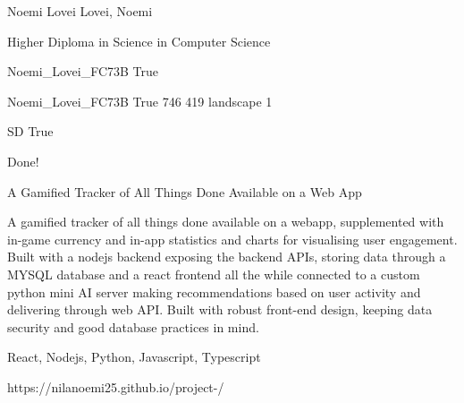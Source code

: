 \documentclass[twoside]{report}
\begin{document}
\begingroup{}\relax



\def\Key{Noemi_Lovei_FC73B}

{Noemi Lovei}
{Lovei, Noemi}

{Higher Diploma in Science in Computer Science}

{Noemi_Lovei_FC73B}
{True}

{Noemi_Lovei_FC73B}
{True}
{746}
{419}
{landscape}
{1}

{SD}
{True}

{Done!}

{A Gamified Tracker of All Things Done Available on a Web App}

{A gamified tracker of all things done available on a webapp, supplemented with in-game currency and in-app statistics and charts for visualising user engagement. Built with a nodejs backend exposing the backend APIs, storing data through a MYSQL database and a react frontend all the while connected to a custom python mini AI server making recommendations based on user activity and delivering through web API. Built with robust front-end design, keeping data security and good database practices in mind.}

{React, Nodejs, Python, Javascript, Typescript}

{https://nilanoemi25.github.io/project-/}
\end{document}

